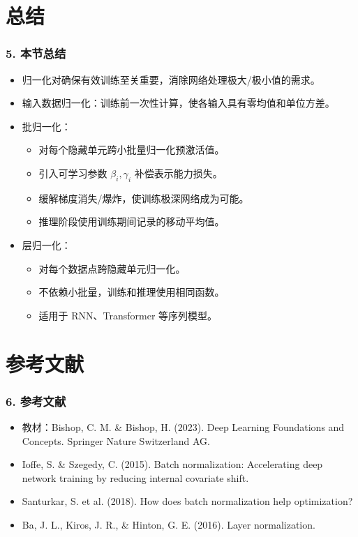 \documentclass[t,aspectratio=169]{beamer} %
\begin{document}
\section{总结}

\begin{frame}
    \frametitle{5. 本节总结}
    \begin{itemize}
        \item \alert{归一化}对确保有效训练至关重要，消除网络处理极大/极小值的需求。
        \item \alert{输入数据归一化}：训练前一次性计算，使各输入具有零均值和单位方差。
        \item \alert{批归一化}：
        \begin{itemize}
            \item 对每个隐藏单元跨小批量归一化预激活值。
            \item 引入可学习参数 $\beta_i, \gamma_i$ 补偿表示能力损失。
            \item 缓解梯度消失/爆炸，使训练极深网络成为可能。
            \item 推理阶段使用训练期间记录的移动平均值。
        \end{itemize}
        \item \alert{层归一化}：
        \begin{itemize}
            \item 对每个数据点跨隐藏单元归一化。
            \item 不依赖小批量，训练和推理使用相同函数。
            \item 适用于 RNN、Transformer 等序列模型。
        \end{itemize}
    \end{itemize}
\end{frame}

\section{参考文献}

\begin{frame}
    \frametitle{6. 参考文献}
    \begin{itemize}
        \item 教材：Bishop, C. M. \& Bishop, H. (2023). Deep Learning Foundations and Concepts. Springer Nature Switzerland AG.
        \item Ioffe, S. \& Szegedy, C. (2015). Batch normalization: Accelerating deep network training by reducing internal covariate shift.
        \item Santurkar, S. et al. (2018). How does batch normalization help optimization?
        \item Ba, J. L., Kiros, J. R., \& Hinton, G. E. (2016). Layer normalization.
    \end{itemize}
\end{frame}
\end{document}
